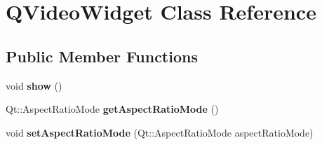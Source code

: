 \hypertarget{classGUI_1_1QtGui_1_1QVideoWidget}{}\section{Q\+Video\+Widget Class Reference}
\label{classGUI_1_1QtGui_1_1QVideoWidget}
\subsection*{Public Member Functions}
\begin{DoxyCompactItemize}
\item 
\hypertarget{classGUI_1_1QtGui_1_1QVideoWidget_a4b148f40a95444d5669406b918ad2f52}{}void {\bfseries show} ()\label{classGUI_1_1QtGui_1_1QVideoWidget_a4b148f40a95444d5669406b918ad2f52}

\item 
\hypertarget{classGUI_1_1QtGui_1_1QVideoWidget_a66c8a6000206622d5a7e7f0ff24908c6}{}Qt\+::\+Aspect\+Ratio\+Mode {\bfseries get\+Aspect\+Ratio\+Mode} ()\label{classGUI_1_1QtGui_1_1QVideoWidget_a66c8a6000206622d5a7e7f0ff24908c6}

\item 
\hypertarget{classGUI_1_1QtGui_1_1QVideoWidget_abee4684ed3a0fc55b3a9ec505e034dde}{}void {\bfseries set\+Aspect\+Ratio\+Mode} (Qt\+::\+Aspect\+Ratio\+Mode aspect\+Ratio\+Mode)\label{classGUI_1_1QtGui_1_1QVideoWidget_abee4684ed3a0fc55b3a9ec505e034dde}

\end{DoxyCompactItemize}
